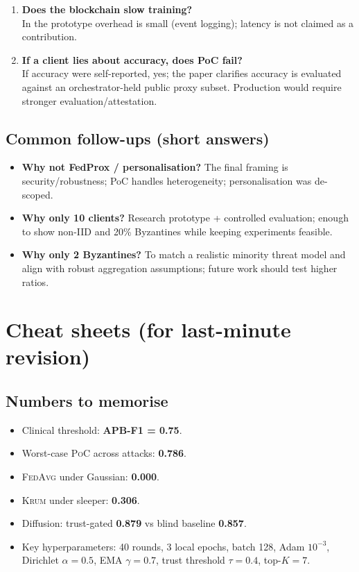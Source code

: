 \documentclass[11pt,a4paper]{article}
\newcommand{\poc}{\textsc{PoC}\xspace}
\newcommand{\fedavg}{\textsc{FedAvg}\xspace}
\newcommand{\krum}{\textsc{Krum}\xspace}
\begin{document}
\begin{enumerate}
\item \textbf{Does the blockchain slow training?}\\
In the prototype overhead is small (event logging); latency is not claimed as a contribution.

\item \textbf{If a client lies about accuracy, does PoC fail?}\\
If accuracy were self-reported, yes; the paper clarifies accuracy is evaluated against an orchestrator-held public proxy subset. Production would require stronger evaluation/attestation.
\end{enumerate}

\subsection{Common follow-ups (short answers)}
\begin{itemize}
\item \textbf{Why not FedProx / personalisation?} The final framing is security/robustness; PoC handles heterogeneity; personalisation was de-scoped.
\item \textbf{Why only 10 clients?} Research prototype + controlled evaluation; enough to show non-IID and 20\% Byzantines while keeping experiments feasible.
\item \textbf{Why only 2 Byzantines?} To match a realistic minority threat model and align with robust aggregation assumptions; future work should test higher ratios.
\end{itemize}

\section{Cheat sheets (for last-minute revision)}

\subsection{Numbers to memorise}
\begin{itemize}
\item Clinical threshold: \textbf{APB-F1 = 0.75}.
\item Worst-case \poc across attacks: \textbf{0.786}.
\item \fedavg under Gaussian: \textbf{0.000}.
\item \krum under sleeper: \textbf{0.306}.
\item Diffusion: trust-gated \textbf{0.879} vs blind baseline \textbf{0.857}.
\item Key hyperparameters: 40 rounds, 3 local epochs, batch 128, Adam $10^{-3}$, Dirichlet $\alpha=0.5$, EMA $\gamma=0.7$, trust threshold $\tau=0.4$, top-$K=7$.
\end{itemize}
\end{document}
